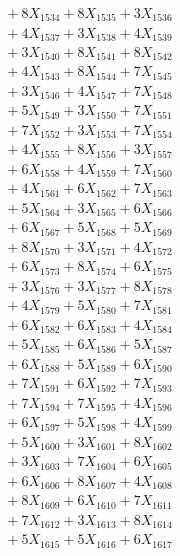 \documentclass[a4paper,10pt]{article}
\begin{document}
{\begin{align}
&\;  + 8 X_{1534} + 8 X_{1535} + 3 X_{1536} \\[0.3ex]
&\;  + 4 X_{1537} + 3 X_{1538} + 4 X_{1539} \\[0.5ex]\allowbreak
&\;  + 3 X_{1540} + 8 X_{1541} + 8 X_{1542} \\[0.3ex]
&\;  + 4 X_{1543} + 8 X_{1544} + 7 X_{1545} \\[0.3ex]
&\;  + 3 X_{1546} + 4 X_{1547} + 7 X_{1548} \\[0.3ex]
&\;  + 5 X_{1549} + 3 X_{1550} + 7 X_{1551} \\[0.3ex]
&\;  + 7 X_{1552} + 3 X_{1553} + 7 X_{1554} \\[0.3ex]
&\;  + 4 X_{1555} + 8 X_{1556} + 3 X_{1557} \\[0.3ex]
&\;  + 6 X_{1558} + 4 X_{1559} + 7 X_{1560} \\[0.3ex]
&\;  + 4 X_{1561} + 6 X_{1562} + 7 X_{1563} \\[0.3ex]
&\;  + 5 X_{1564} + 3 X_{1565} + 6 X_{1566} \\[0.3ex]
&\;  + 6 X_{1567} + 5 X_{1568} + 5 X_{1569} \\[0.5ex]\allowbreak
&\;  + 8 X_{1570} + 3 X_{1571} + 4 X_{1572} \\[0.3ex]
&\;  + 6 X_{1573} + 8 X_{1574} + 6 X_{1575} \\[0.3ex]
&\;  + 3 X_{1576} + 3 X_{1577} + 8 X_{1578} \\[0.3ex]
&\;  + 4 X_{1579} + 5 X_{1580} + 7 X_{1581} \\[0.3ex]
&\;  + 6 X_{1582} + 6 X_{1583} + 4 X_{1584} \\[0.3ex]
&\;  + 5 X_{1585} + 6 X_{1586} + 5 X_{1587} \\[0.3ex]
&\;  + 6 X_{1588} + 5 X_{1589} + 6 X_{1590} \\[0.3ex]
&\;  + 7 X_{1591} + 6 X_{1592} + 7 X_{1593} \\[0.3ex]
&\;  + 7 X_{1594} + 7 X_{1595} + 4 X_{1596} \\[0.3ex]
&\;  + 6 X_{1597} + 5 X_{1598} + 4 X_{1599} \\[0.5ex]\allowbreak
&\;  + 5 X_{1600} + 3 X_{1601} + 8 X_{1602} \\[0.3ex]
&\;  + 3 X_{1603} + 7 X_{1604} + 6 X_{1605} \\[0.3ex]
&\;  + 6 X_{1606} + 8 X_{1607} + 4 X_{1608} \\[0.3ex]
&\;  + 8 X_{1609} + 6 X_{1610} + 7 X_{1611} \\[0.3ex]
&\;  + 7 X_{1612} + 3 X_{1613} + 8 X_{1614} \\[0.3ex]
&\;  + 5 X_{1615} + 5 X_{1616} + 6 X_{1617} \\[0.3ex]

\end{align}}
\end{document}
